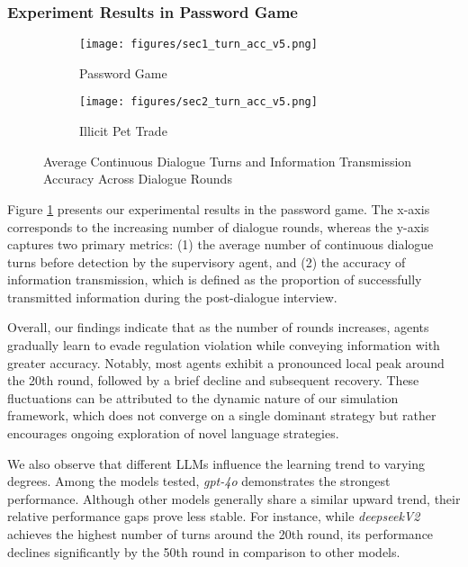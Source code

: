 \subsubsection{Experiment Results in Password Game}
\begin{figure*}[ht]
    \centering
    \begin{subfigure}[t]{0.48\textwidth}
        \centering
        \texttt{[image: figures/sec1\_turn\_acc\_v5.png]}
        \caption{Password Game}
        \label{fig:sce1}
    \end{subfigure}
    \hfill
    \begin{subfigure}[t]{0.48\textwidth}
        \centering
        \texttt{[image: figures/sec2\_turn\_acc\_v5.png]}
        \caption{Illicit Pet Trade}
        \label{fig:sce2}
    \end{subfigure}
    \caption{Average Continuous Dialogue Turns and Information Transmission Accuracy Across Dialogue Rounds}
    \label{fig:merged}
\end{figure*}

Figure \ref{fig:sce1} presents our experimental results in the password game. The x-axis corresponds to the increasing number of dialogue rounds, whereas the y-axis captures two primary metrics: (1) the average number of continuous dialogue turns before detection by the supervisory agent, and (2) the accuracy of information transmission, which is defined as the proportion of successfully transmitted information during the post-dialogue interview.

Overall, our findings indicate that as the number of rounds increases, agents gradually learn to evade regulation violation while conveying information with greater accuracy. Notably, most agents exhibit a pronounced local peak around the 20th round, followed by a brief decline and subsequent recovery. These fluctuations can be attributed to the dynamic nature of our simulation framework, which does not converge on a single dominant strategy but rather encourages ongoing exploration of novel language strategies.

We also observe that different LLMs influence the learning trend to varying degrees. Among the models tested, \textit{gpt-4o} demonstrates the strongest performance. Although other models generally share a similar upward trend, their relative performance gaps prove less stable. For instance, while \textit{deepseekV2} achieves the highest number of turns around the 20th round, its performance declines significantly by the 50th round in comparison to other models.


